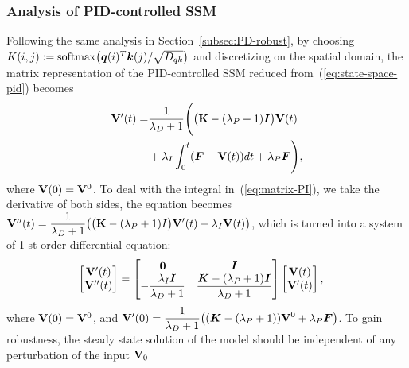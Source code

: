\subsubsection{Analysis of PID-controlled SSM}

Following the same analysis in Section~\ref{subsec:PD-robust}, by choosing $K(i,j):= {\rm softmax}\bigl({\bm q}(i)^{T}{\bm k}(j)/\sqrt{D_{qk}}\bigl)$ and discretizing on the spatial domain, the matrix representation of the PID-controlled SSM reduced from~(\ref{eq:state-space-pid}) becomes
\begin{equation}
 \begin{aligned}
\label{eq:matrix-PI}
   {\mathbf V}'(t) =&\frac{1}{\lambda_D + 1} \Bigg( \bigl({\mathbf K} - (\lambda_P + 1)\bm{I}\bigl){\mathbf V}(t) \\
   &+ \lambda_I \int_{0}^t (\bm{F} - {\mathbf V}(t))dt
    + \lambda_P \bm{F} \Bigg),
\end{aligned}   
\end{equation}
where ${\mathbf V}(0) = {\mathbf V}^0$. To deal with the integral in~(\ref{eq:matrix-PI}), we take the derivative of both sides, the equation becomes ${\mathbf V}''(t) = \displaystyle \frac{1}{\lambda_D + 1} \big(\big({\mathbf K} - (\lambda_P + 1)I \big){\mathbf V}'(t) - \lambda_I{\mathbf V}(t) \big)$, which is turned into a system of 1-st order differential equation:
\begin{equation}
\begin{aligned}
    \label{eq:ode-pi}
    \begin{bmatrix} {\mathbf V}'(t) \\ {\mathbf V}''(t) \end{bmatrix} &= \begin{bmatrix} \bm{0} & \bm{I} \\ \displaystyle -\frac{\lambda_I\bm{I}}{\lambda_D + 1} &\displaystyle \frac{\bm{K} - (\lambda_P + 1)\bm{I}}{\lambda_D + 1} \end{bmatrix} \begin{bmatrix} {\mathbf V}(t) \\ {\mathbf V}'(t) \end{bmatrix},
\end{aligned}
\end{equation}
where ${\mathbf V}(0) = {\mathbf V}^0$, and ${\mathbf V}'(0) =\displaystyle \frac{1}{\lambda_D + 1} \big( (\bm{K} - (\lambda_P + 1)){\mathbf V}^0 + \lambda_P\bm{F} \big)$.
To gain robustness, the steady state solution of the model should be independent of any perturbation of the input ${\mathbf V}_0$
